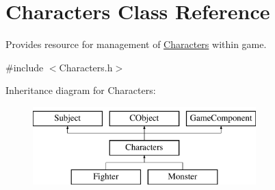 \hypertarget{class_characters}{}\section{Characters Class Reference}
\label{class_characters}


Provides resource for management of \hyperlink{class_characters}{Characters} within game.  




{\ttfamily \#include $<$Characters.\+h$>$}

Inheritance diagram for Characters\+:\begin{figure}[H]
\begin{center}
\leavevmode
\includegraphics[height=3.000000cm]{class_characters}
\end{center}
\end{figure}
